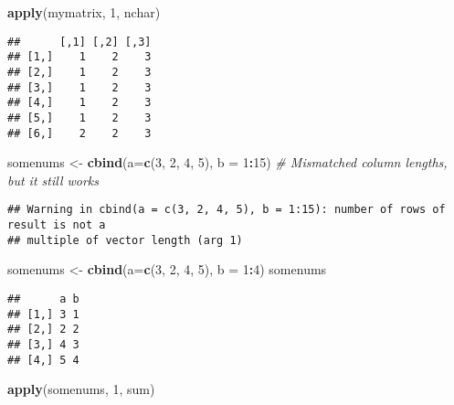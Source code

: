 \documentclass[
]{article}
\newenvironment{Shaded}{\begin{snugshade}}{\end{snugshade}}
\newcommand{\CommentTok}[1]{\textcolor[rgb]{0.56,0.35,0.01}{\textit{#1}}}
\newcommand{\DataTypeTok}[1]{\textcolor[rgb]{0.13,0.29,0.53}{#1}}
\newcommand{\DecValTok}[1]{\textcolor[rgb]{0.00,0.00,0.81}{#1}}
\newcommand{\KeywordTok}[1]{\textcolor[rgb]{0.13,0.29,0.53}{\textbf{#1}}}
\newcommand{\NormalTok}[1]{#1}
\newcommand{\OperatorTok}[1]{\textcolor[rgb]{0.81,0.36,0.00}{\textbf{#1}}}
\newcommand{\StringTok}[1]{\textcolor[rgb]{0.31,0.60,0.02}{#1}}
\begin{document}
\begin{Shaded}
\begin{Highlighting}[]
\KeywordTok{apply}\NormalTok{(mymatrix, }\DecValTok{1}\NormalTok{, nchar)}
\end{Highlighting}
\end{Shaded}

\begin{verbatim}
##      [,1] [,2] [,3]
## [1,]    1    2    3
## [2,]    1    2    3
## [3,]    1    2    3
## [4,]    1    2    3
## [5,]    1    2    3
## [6,]    2    2    3
\end{verbatim}

\begin{Shaded}
\begin{Highlighting}[]
\NormalTok{somenums <-}\StringTok{ }\KeywordTok{cbind}\NormalTok{(}\DataTypeTok{a=}\KeywordTok{c}\NormalTok{(}\DecValTok{3}\NormalTok{, }\DecValTok{2}\NormalTok{, }\DecValTok{4}\NormalTok{, }\DecValTok{5}\NormalTok{), }\DataTypeTok{b =} \DecValTok{1}\OperatorTok{:}\DecValTok{15}\NormalTok{) }\CommentTok{# Mismatched column lengths, but it still works}
\end{Highlighting}
\end{Shaded}

\begin{verbatim}
## Warning in cbind(a = c(3, 2, 4, 5), b = 1:15): number of rows of result is not a
## multiple of vector length (arg 1)
\end{verbatim}

\begin{Shaded}
\begin{Highlighting}[]
\NormalTok{somenums <-}\StringTok{ }\KeywordTok{cbind}\NormalTok{(}\DataTypeTok{a=}\KeywordTok{c}\NormalTok{(}\DecValTok{3}\NormalTok{, }\DecValTok{2}\NormalTok{, }\DecValTok{4}\NormalTok{, }\DecValTok{5}\NormalTok{), }\DataTypeTok{b =} \DecValTok{1}\OperatorTok{:}\DecValTok{4}\NormalTok{)}
\NormalTok{somenums}
\end{Highlighting}
\end{Shaded}

\begin{verbatim}
##      a b
## [1,] 3 1
## [2,] 2 2
## [3,] 4 3
## [4,] 5 4
\end{verbatim}

\begin{Shaded}
\begin{Highlighting}[]
\KeywordTok{apply}\NormalTok{(somenums, }\DecValTok{1}\NormalTok{, sum)}
\end{Highlighting}
\end{Shaded}
\end{document}
